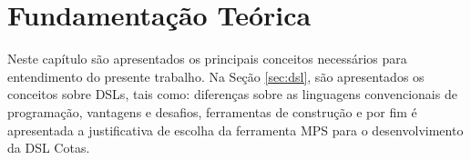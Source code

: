 \chapter{Fundamentação Teórica}
\label{chap:fundamentacao}

Neste capítulo são apresentados os principais conceitos necessários para entendimento do presente trabalho. Na Seção \ref{sec:dsl}, são apresentados os conceitos sobre \gls{DSL}s, tais como: diferenças sobre as linguagens convencionais de programação, vantagens e desafios, ferramentas de construção e por fim é apresentada a justificativa de escolha da ferramenta \gls{MPS} para o desenvolvimento da DSL Cotas.






